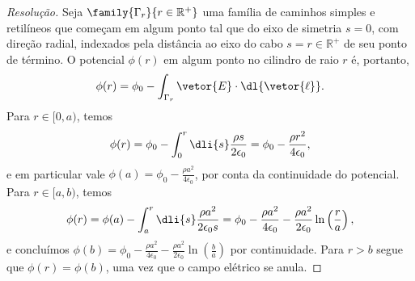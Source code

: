 \begin{proof}[Resolução]
    Seja \(\family{\Gamma_r}{r \in \mathbb{R}^+}\) uma família de caminhos simples e retilíneos que começam em algum ponto tal que do eixo de simetria \(s = 0\), com direção radial, indexados pela distância ao eixo do cabo \(s = r \in \mathbb{R}^+\) de seu ponto de término. O potencial \(\phi(r)\) em algum ponto no cilindro de raio \(r\) é, portanto,
    \begin{equation*}
        \phi(r)  = \phi_0 -\int_{\Gamma_r} \vetor{E}\cdot \dl{\vetor{\ell}}.
    \end{equation*}
    Para \(r \in [0, a)\), temos
    \begin{equation*}
        \phi(r) = \phi_0 -\int_{0}^{r} \dli{s} \frac{\rho s}{2 \epsilon_0}= \phi_0 - \frac{\rho r^2}{4 \epsilon_0},
    \end{equation*}
    e em particular vale \(\phi(a) = \phi_0 - \frac{\rho a^2}{4 \epsilon_0}\), por conta da continuidade do potencial. Para \(r \in [a, b)\), temos
    \begin{equation*}
        \phi(r) = \phi(a) - \int_a^r \dli{s}\frac{\rho a^2}{2 \epsilon_0 s} = \phi_0 - \frac{\rho a^2}{4 \epsilon_0} - \frac{\rho a^2}{2 \epsilon_0} \ln\left(\frac{r}{a}\right),
    \end{equation*}
    e concluímos \(\phi(b) = \phi_0 - \frac{\rho a^2}{4 \epsilon_0} - \frac{\rho a^2}{2 \epsilon_0}\ln\left(\frac{b}{a}\right)\) por continuidade. Para \(r > b\) segue que \(\phi(r) = \phi(b)\), uma vez que o campo elétrico se anula.


\end{proof}
